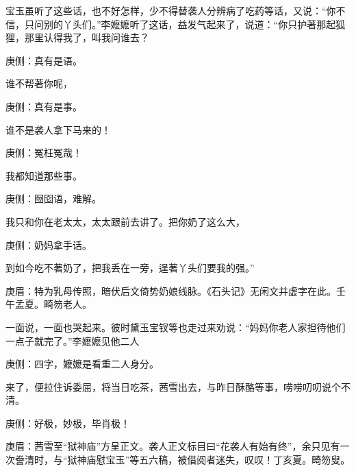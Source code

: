 \begin{parag}
    宝玉虽听了这些话，也不好怎样，少不得替袭人分辨病了吃药等话，又说：“你不信，只问别的丫头们。”李嬷嬷听了这话，益发气起来了，说道：“你只护著那起狐狸，那里认得我了，叫我问谁去？\begin{note}庚侧：真有是语。\end{note}谁不帮著你呢，\begin{note}庚侧：真有是事。\end{note}谁不是袭人拿下马来的！\begin{note}庚侧：冤枉冤哉！\end{note}我都知道那些事。\begin{note}庚侧：囫囵语，难解。\end{note}我只和你在老太太，太太跟前去讲了。把你奶了这么大，\begin{note}庚侧：奶妈拿手话。\end{note}到如今吃不著奶了，把我丢在一旁，逞著丫头们要我的强。”\begin{note}庚眉：特为乳母传照，暗伏后文倚势奶娘线脉。《石头记》无闲文并虚字在此。壬午孟夏。畸笏老人。\end{note}一面说，一面也哭起来。彼时黛玉宝钗等也走过来劝说：“妈妈你老人家担待他们一点子就完了。”李嬷嬷见他二人\begin{note}庚侧：四字，嬷嬷是看重二人身分。\end{note}来了，便拉住诉委屈，将当日吃茶，茜雪出去，与昨日酥酪等事，唠唠叨叨说个不清。\begin{note}庚侧：好极，妙极，毕肖极！\end{note}\begin{note}庚眉：茜雪至“狱神庙”方呈正文。袭人正文标目曰“花袭人有始有终”，余只见有一次誊清时，与“狱神庙慰宝玉”等五六稿，被借阅者迷失，叹叹！丁亥夏。畸笏叟。\end{note}
\end{parag}


